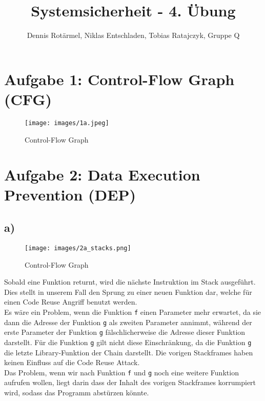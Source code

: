 \documentclass{article}
\title{Systemsicherheit - 4. Übung}
\author{Dennis Rotärmel, Niklas Entschladen, Tobias Ratajczyk, Gruppe Q}
\begin{document}
\maketitle
	
\newpage
\thispagestyle{empty}
\section{Aufgabe 1: Control-Flow Graph (CFG)}
\begin{figure}[h]
	\centering\texttt{[image: images/1a.jpeg]}
	\caption{Control-Flow Graph}
\end{figure}
\pagebreak
\section{Aufgabe 2: Data Execution Prevention (DEP)}
\subsection{a)}
\begin{figure}[h]
\centering\texttt{[image: images/2a\_stacks.png]}
\caption{Control-Flow Graph}
\end{figure}
Sobald eine Funktion returnt, wird die nächste Instruktion im Stack ausgeführt. Dies stellt in unserem Fall den Sprung zu einer neuen Funktion dar, welche für einen Code Reuse Angriff benutzt werden.\\
Es wäre ein Problem, wenn die Funktion \verb|f| einen Parameter mehr erwartet, da sie dann die Adresse der Funktion \verb|g| als zweiten Parameter annimmt, während der erste Parameter der Funktion \verb|g| fälschlicherweise die Adresse dieser Funktion darstellt. Für die Funktion \verb|g| gilt nicht diese Einschränkung, da die Funktion \verb|g| die letzte Library-Funktion der Chain darstellt. Die vorigen Stackframes haben keinen Einfluss auf die Code Reuse Attack.\\
Das Problem, wenn wir nach Funktion \verb|f| und \verb|g| noch eine weitere Funktion aufrufen wollen, liegt darin dass der Inhalt des vorigen Stackframes korrumpiert wird, sodass das Programm abstürzen könnte.
\end{document}
